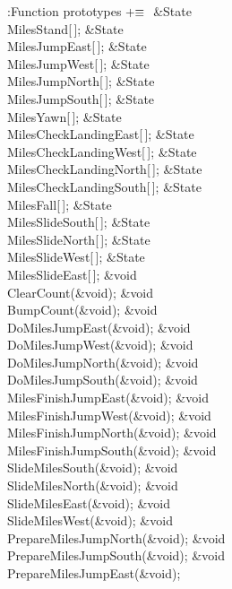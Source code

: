 \B{}:Function prototypes\X${}\mathrel+\equiv{}$\6
\&{State} \\{MilesStand}[\,];\6
\&{State} \\{MilesJumpEast}[\,];\6
\&{State} \\{MilesJumpWest}[\,];\6
\&{State} \\{MilesJumpNorth}[\,];\6
\&{State} \\{MilesJumpSouth}[\,];\6
\&{State} \\{MilesYawn}[\,];\6
\&{State} \\{MilesCheckLandingEast}[\,];\6
\&{State} \\{MilesCheckLandingWest}[\,];\6
\&{State} \\{MilesCheckLandingNorth}[\,];\6
\&{State} \\{MilesCheckLandingSouth}[\,];\6
\&{State} \\{MilesFall}[\,];\6
\&{State} \\{MilesSlideSouth}[\,];\6
\&{State} \\{MilesSlideNorth}[\,];\6
\&{State} \\{MilesSlideWest}[\,];\6
\&{State} \\{MilesSlideEast}[\,];\7
\&{void} \\{ClearCount}(\&{void});\6
\&{void} \\{BumpCount}(\&{void});\6
\&{void} \\{DoMilesJumpEast}(\&{void});\6
\&{void} \\{DoMilesJumpWest}(\&{void});\6
\&{void} \\{DoMilesJumpNorth}(\&{void});\6
\&{void} \\{DoMilesJumpSouth}(\&{void});\6
\&{void} \\{MilesFinishJumpEast}(\&{void});\6
\&{void} \\{MilesFinishJumpWest}(\&{void});\6
\&{void} \\{MilesFinishJumpNorth}(\&{void});\6
\&{void} \\{MilesFinishJumpSouth}(\&{void});\6
\&{void} \\{SlideMilesSouth}(\&{void});\6
\&{void} \\{SlideMilesNorth}(\&{void});\6
\&{void} \\{SlideMilesEast}(\&{void});\6
\&{void} \\{SlideMilesWest}(\&{void});\6
\&{void} \\{PrepareMilesJumpNorth}(\&{void});\6
\&{void} \\{PrepareMilesJumpSouth}(\&{void});\6
\&{void} \\{PrepareMilesJumpEast}(\&{void});\6
